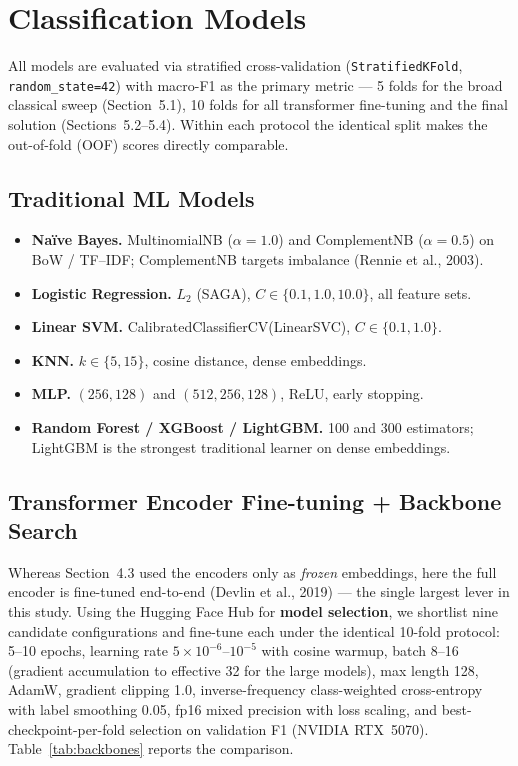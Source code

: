 \documentclass[11pt,a4paper]{article}
\newcommand{\tH}[1]{\textcolor{maincolor}{\textbf{#1}}}
\begin{document}
\section{Classification Models}
All models are evaluated via stratified cross-validation (\texttt{StratifiedKFold},
\texttt{random\_state=42}) with macro-F1 as the primary metric --- 5 folds for the broad classical
sweep (Section~5.1), 10 folds for all transformer fine-tuning and the final solution
(Sections~5.2--5.4). Within each protocol the identical split makes the out-of-fold (OOF) scores
directly comparable.

\subsection{Traditional ML Models}
\begin{itemize}
  \item \tH{Na\"ive Bayes.} MultinomialNB ($\alpha=1.0$) and ComplementNB ($\alpha=0.5$) on
  BoW / TF--IDF; ComplementNB targets imbalance (Rennie et al., 2003).
  \item \tH{Logistic Regression.} $L_2$ (SAGA), $C \in \{0.1, 1.0, 10.0\}$, all feature sets.
  \item \tH{Linear SVM.} CalibratedClassifierCV(LinearSVC), $C \in \{0.1, 1.0\}$.
  \item \tH{KNN.} $k \in \{5, 15\}$, cosine distance, dense embeddings.
  \item \tH{MLP.} $(256,128)$ and $(512,256,128)$, ReLU, early stopping.
  \item \tH{Random Forest / XGBoost / LightGBM.} 100 and 300 estimators; LightGBM is the strongest
  traditional learner on dense embeddings.
\end{itemize}

\subsection{Transformer Encoder Fine-tuning + Backbone Search}
Whereas Section~4.3 used the encoders only as \emph{frozen} embeddings, here the full encoder is
fine-tuned end-to-end (Devlin et al., 2019) --- the single largest lever in this study. Using the
Hugging Face Hub for \textbf{model selection}, we shortlist nine candidate configurations and
fine-tune each under the identical 10-fold protocol: 5--10 epochs, learning rate
$5\times10^{-6}$--$10^{-5}$ with cosine warmup, batch 8--16 (gradient accumulation to effective 32
for the large models), max length 128, AdamW, gradient clipping 1.0, inverse-frequency
class-weighted cross-entropy with label smoothing 0.05, fp16 mixed precision with loss scaling, and
best-checkpoint-per-fold selection on validation F1 (NVIDIA RTX~5070).
Table~\ref{tab:backbones} reports the comparison.
\end{document}
